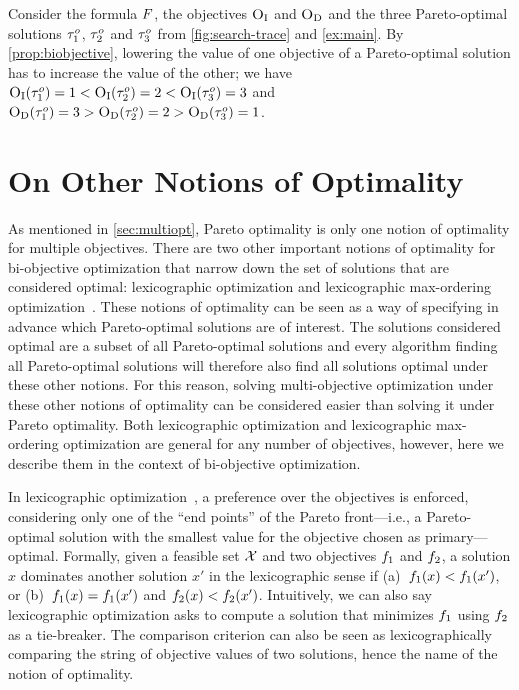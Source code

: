 \begin{example}
  Consider the formula $F$, the objectives $\textsc{O}_{\text{I}}$ and $\textsc{O}_{\text{D}}$ and the three Pareto-optimal solutions $\tau^o_1$, $\tau^o_2$ and $\tau^o_3$ from \cref{fig:search-trace} and \cref{ex:main}.
  By \cref{prop:biobjective}, lowering the value of one objective of a Pareto-optimal solution has to increase the value of the other;
  we have $\textsc{O}_{\text{I}}(\tau^o_1) = 1 < \textsc{O}_{\text{I}}(\tau^o_2) = 2 < \textsc{O}_{\text{I}}(\tau^o_3) = 3$ and $\textsc{O}_{\text{D}}(\tau^o_1) = 3 > \textsc{O}_{\text{D}}(\tau^o_2) = 2 > \textsc{O}_{\text{D}}(\tau^o_3) = 1$.
\end{example}

\section{On Other Notions of Optimality}

As mentioned in \cref{sec:multiopt}, Pareto optimality is only one notion of optimality for multiple objectives.
There are two other important notions of optimality for bi-objective optimization that narrow down the set of solutions that are considered optimal:
lexicographic optimization and lexicographic max-ordering optimization~\autocite{Ehrgott2005-5}.
These notions of optimality can be seen as a way of specifying in advance which Pareto-optimal solutions are of interest.
The solutions considered optimal are a subset of all Pareto-optimal solutions and every algorithm finding all Pareto-optimal solutions will therefore also find all solutions optimal under these other notions.
For this reason, solving multi-objective optimization under these other notions of optimality can be considered easier than solving it under Pareto optimality.
Both lexicographic optimization and lexicographic max-ordering optimization are general for any number of objectives, however, here we describe them in the context of bi-objective optimization.

In lexicographic optimization~\autocite{Ehrgott2005-5}, a preference over the objectives is enforced, considering only one of the ``end points'' of the Pareto front---i.e., a Pareto-optimal solution with the smallest value for the objective chosen as primary---optimal.
Formally, given a feasible set $\mathcal{X}$ and two objectives $f_1$ and $f_2$, a solution $x$ dominates another solution $x'$ in the lexicographic sense if (a)~$f_1(x) < f_1(x')$, or (b)~$f_1(x) = f_1(x')$ and $f_2(x) < f_2(x')$.
Intuitively, we can also say lexicographic optimization asks to compute a solution that minimizes $f_1$ using $f_2$ as a tie-breaker.
The comparison criterion can also be seen as lexicographically comparing the string of objective values of two solutions, hence the name of the notion of optimality.

